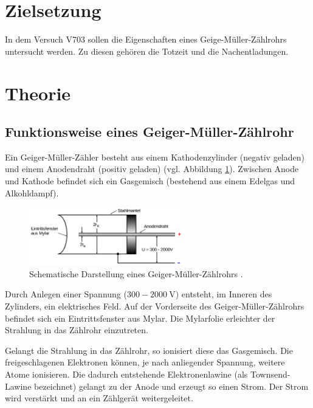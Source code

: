 \setcounter{page}{1}
\section*{Zielsetzung}

In dem Versuch V703 sollen die Eigenschaften eines %
Geige-Müller-Zählrohrs untersucht werden. Zu diesen gehören die %
Totzeit und die Nachentladungen. %

\section{Theorie}

\subsection{Funktionsweise eines Geiger-Müller-Zählrohr}
Ein Geiger-Müller-Zähler besteht aus einem %
Kathodenzylinder (negativ geladen) und einem Anodendraht (positiv geladen) (vgl. Abbildung \ref{fig: schematischer_aufbau}).
Zwischen Anode und Kathode befindet sich ein Gasgemisch (bestehend aus einem Edelgas
und Alkohldampf).
\begin{figure}
  \centering
  \includegraphics[width=0.6\textwidth]{bilder/geiger_.png}
  \caption{Schematische Darstellung eines Geiger-Müller-Zählrohrs \cite{anleitung703}.}
  \label{fig: schematischer_aufbau}
  \end{figure}
Durch Anlegen einer Spannung ($300-\SI{2000}{\volt}$) entsteht, im Inneren des Zylinders, ein elektrisches
Feld. Auf der Vorderseite des Geiger-Müller-Zählrohrs %
befindet sich ein Eintrittsfenster aus Mylar. %
Die Mylarfolie erleichter der Strahlung in das Zählrohr einzutreten.

Gelangt die  Strahlung in das Zählrohr, so ionisiert diese das Gasgemisch. %
Die freigeschlagenen Elektronen können, je nach anliegender Spannung, weitere Atome ionisieren. %
Die dadurch entstehende Elektronenlawine (als Townsend-Lawine bezeichnet) gelangt zu der Anode und erzeugt so
einen Strom. Der Strom wird verstärkt und an ein %
Zählgerät weitergeleitet.

